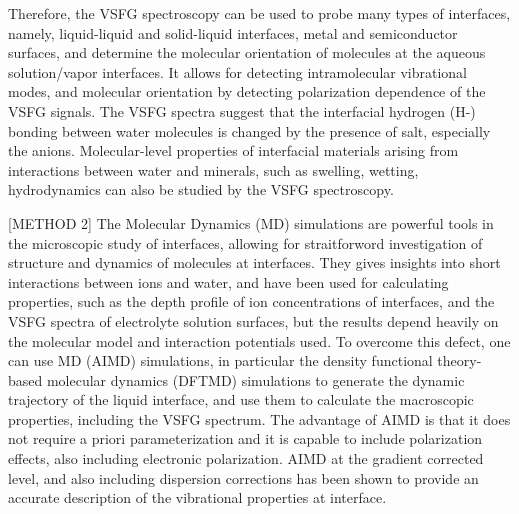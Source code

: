Therefore, the VSFG spectroscopy can be used to probe many types of interfaces, namely, liquid-liquid and 
solid-liquid interfaces\cite{Guyot-Sionnest1987,RS91,Du93,QD94,Richmond02,Gopalakrishnan2006,ShenYR2006,Morita2008}, metal and semiconductor surfaces\cite{Harris87,Superfine88},
and determine the molecular orientation of molecules at the aqueous solution/vapor interfaces.
It allows for detecting intramolecular vibrational modes, and molecular orientation by detecting polarization dependence of the VSFG signals\cite{Vidal05}.  
The VSFG spectra suggest that the interfacial hydrogen (H-) bonding between water molecules is changed by the presence of salt, 
especially the anions\cite{EAR04}.
Molecular-level properties of interfacial materials arising from interactions between water and minerals, 
such as swelling, wetting, hydrodynamics can also be studied by the VSFG spectroscopy\cite{Rotenberg14}.

[METHOD 2]
The Molecular Dynamics (MD) simulations are powerful tools in the microscopic study of interfaces,
allowing for straitforword investigation of structure and dynamics of molecules at interfaces\cite{Morita2008}.
They gives insights into short interactions between ions and water, and have been used for calculating properties, 
such as the depth profile of ion concentrations of interfaces\cite{Jungwirth2001,Jungwirth2002}, and the VSFG spectra 
of electrolyte solution surfaces\cite{Gopalakrishnan2006,Johnson2014,Ishiyama2014,Ishiyama2017},
but the results depend heavily on the molecular model and interaction potentials used\cite{LXD03,MKP04,TI07,MM05}.
To overcome this defect, one can use \abinitio MD (AIMD) simulations, 
in particular the density functional theory-based molecular dynamics (DFTMD) simulations to generate the dynamic trajectory of 
the liquid interface, and use them to calculate the macroscopic properties, including the VSFG spectrum.  
The advantage of AIMD is that it does not require a priori parameterization and it is capable to include polarization effects\cite{Ufimtsev2011},
also including electronic polarization. AIMD at the gradient corrected level, and also including dispersion corrections\cite{Grimme04,Grimme06,Grimme07,Grimme10,Baer2011}
has been shown to provide an accurate description of the vibrational properties at interface\cite{Fornaro2015}.

